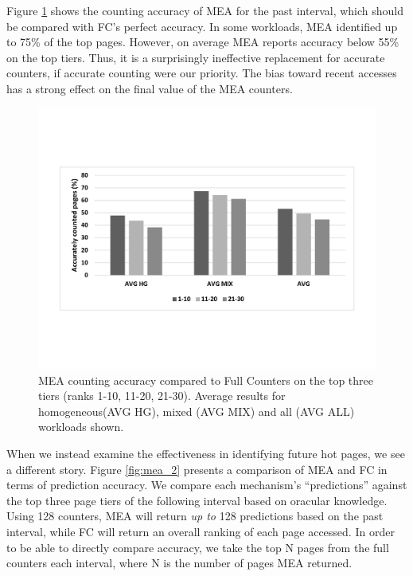 Figure \ref{fig:mea_1} shows the counting accuracy of MEA for the 
past interval, which should be compared with FC's perfect accuracy.
In some workloads, MEA identified up to 75\% of the top pages. 
However, on average MEA reports accuracy below 55\% on the top tiers. 
Thus, it is a surprisingly ineffective replacement for accurate counters,
if accurate counting were our priority.  The bias toward recent accesses
has a strong effect on the final value of the MEA counters.


\begin{figure}[t]
\centering
  \includegraphics[scale=.3]{figures/mea_1_v2.pdf}
  \caption{MEA counting accuracy compared to Full Counters on the top three tiers (ranks 1-10, 11-20, 21-30). Average results for homogeneous(AVG HG), mixed (AVG MIX) and all (AVG ALL) workloads shown.}
  \label{fig:mea_1}
\end{figure}

When we instead examine the effectiveness in identifying future hot pages,
we see a different story.  Figure \ref{fig:mea_2} presents a comparison of MEA and FC in terms of prediction accuracy. We compare each mechanism's 
``predictions'' against the top three page tiers of the following interval based on oracular knowledge. 
Using 128 counters, MEA will return \textit{up to} 128 predictions based on the past interval, while FC will return an overall ranking of each page accessed. 
In order to be able to directly compare accuracy, 
we take the top N pages from the full counters
each interval,
where N is the number of pages MEA returned.

